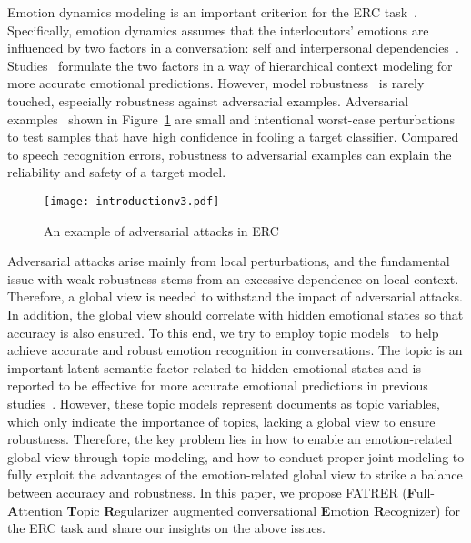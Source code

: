 \documentclass{ecai}
\begin{document}
Emotion dynamics modeling is an important criterion for the ERC task~\cite{kuppens2017emotion}. Specifically, emotion dynamics assumes that the interlocutors' emotions are influenced by two factors in a conversation: self and interpersonal dependencies~\cite{morris2000emotions}. Studies~\cite{mao2021dialoguetrm, shen2021dialogxl, zhu2021topic,li2022contrast} formulate the two factors in a way of hierarchical context modeling for more accurate emotional predictions. However, model robustness~\cite{wang2022measure} is rarely touched, especially robustness against adversarial examples. Adversarial examples~\cite{jin2019bert,ren-etal-2019-generating} shown in Figure~\ref{fig:introduction} are small and intentional worst-case perturbations to test samples that have high confidence in fooling a target classifier. Compared to speech recognition errors, robustness to adversarial examples can explain the reliability and safety of a target model.

\begin{figure}
 \centering
 \texttt{[image: introductionv3.pdf]}
 \caption{An example of adversarial attacks in ERC}
 \label{fig:introduction}
\end{figure}

Adversarial attacks arise mainly from local perturbations, and the fundamental issue with weak robustness stems from an excessive dependence on local context. Therefore, a global view is needed to withstand the impact of adversarial attacks. In addition, the global view should correlate with hidden emotional states so that accuracy is also ensured. To this end, we try to employ topic models~\cite{blei2003latent} to help achieve accurate and robust emotion recognition in conversations. The topic is an important latent semantic factor related to hidden emotional states and is reported to be effective for more accurate emotional predictions in previous studies~\cite{wang2020sentiment,wang2020end,zhu2021topic}. However, these topic models represent documents as topic variables, which only indicate the importance of topics, lacking a global view to ensure robustness. Therefore, the key problem lies in how to enable an emotion-related global view through topic modeling, and how to conduct proper joint modeling to fully exploit the advantages of the emotion-related global view to strike a balance between accuracy and robustness. In this paper, we propose FATRER (\textbf{F}ull-\textbf{A}ttention \textbf{T}opic \textbf{R}egularizer augmented conversational \textbf{E}motion \textbf{R}ecognizer) for the ERC task and share our insights on the above issues. 
\end{document}
